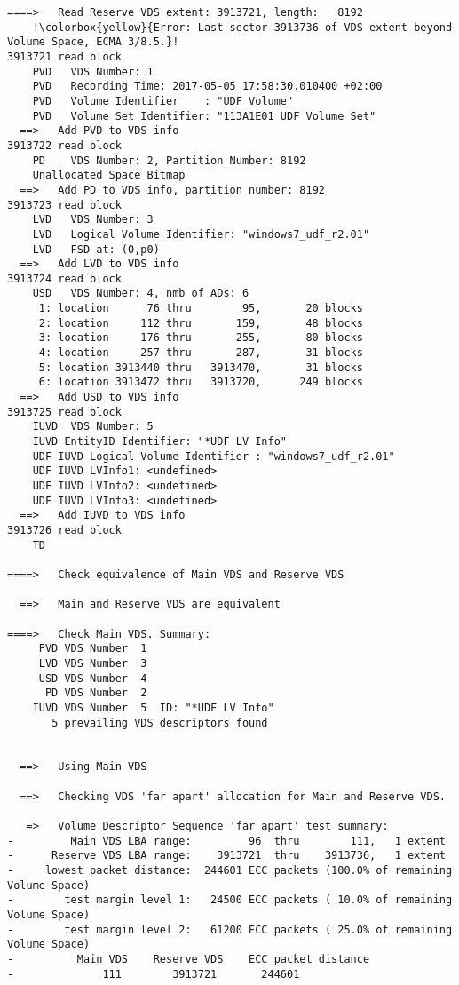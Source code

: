 \begin{lstlisting}
====>   Read Reserve VDS extent: 3913721, length:   8192
    !\colorbox{yellow}{Error: Last sector 3913736 of VDS extent beyond Volume Space, ECMA 3/8.5.}!
3913721 read block
    PVD   VDS Number: 1
    PVD   Recording Time: 2017-05-05 17:58:30.010400 +02:00
    PVD   Volume Identifier    : "UDF Volume"
    PVD   Volume Set Identifier: "113A1E01 UDF Volume Set"
  ==>   Add PVD to VDS info
3913722 read block
    PD    VDS Number: 2, Partition Number: 8192
    Unallocated Space Bitmap
  ==>   Add PD to VDS info, partition number: 8192
3913723 read block
    LVD   VDS Number: 3
    LVD   Logical Volume Identifier: "windows7_udf_r2.01"
    LVD   FSD at: (0,p0)
  ==>   Add LVD to VDS info
3913724 read block
    USD   VDS Number: 4, nmb of ADs: 6
     1: location      76 thru        95,       20 blocks
     2: location     112 thru       159,       48 blocks
     3: location     176 thru       255,       80 blocks
     4: location     257 thru       287,       31 blocks
     5: location 3913440 thru   3913470,       31 blocks
     6: location 3913472 thru   3913720,      249 blocks
  ==>   Add USD to VDS info
3913725 read block
    IUVD  VDS Number: 5
    IUVD EntityID Identifier: "*UDF LV Info"
    UDF IUVD Logical Volume Identifier : "windows7_udf_r2.01"
    UDF IUVD LVInfo1: <undefined>
    UDF IUVD LVInfo2: <undefined>
    UDF IUVD LVInfo3: <undefined>
  ==>   Add IUVD to VDS info
3913726 read block
    TD  

====>   Check equivalence of Main VDS and Reserve VDS

  ==>   Main and Reserve VDS are equivalent

====>   Check Main VDS. Summary:
     PVD VDS Number  1
     LVD VDS Number  3
     USD VDS Number  4
      PD VDS Number  2
    IUVD VDS Number  5  ID: "*UDF LV Info"
       5 prevailing VDS descriptors found


  ==>   Using Main VDS

  ==>   Checking VDS 'far apart' allocation for Main and Reserve VDS.

   =>   Volume Descriptor Sequence 'far apart' test summary:
-         Main VDS LBA range:         96  thru        111,   1 extent
-      Reserve VDS LBA range:    3913721  thru    3913736,   1 extent
-     lowest packet distance:  244601 ECC packets (100.0% of remaining Volume Space)
-        test margin level 1:   24500 ECC packets ( 10.0% of remaining Volume Space)
-        test margin level 2:   61200 ECC packets ( 25.0% of remaining Volume Space)
-          Main VDS    Reserve VDS    ECC packet distance
-              111        3913721       244601                      



\end{lstlisting}

